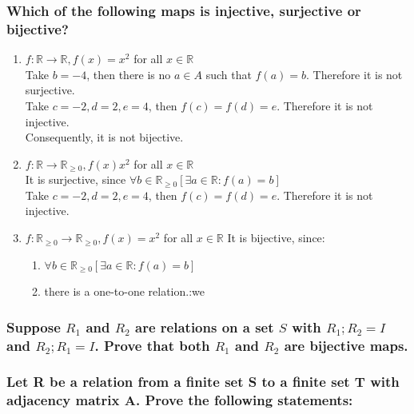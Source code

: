 \subsubsection{Which of the following maps is injective, surjective or bijective?}
\begin{enumerate}[label=(\alph*)]
    \item $f: \mathbb{R} \rightarrow \mathbb{R}, f(x) = x^2$ for all $x \in \mathbb{R}$\\
    Take $b = -4$, then there is no $a \in A$ such that $f(a) = b$. Therefore it is not surjective.\\
    Take $c = -2, d=2, e=4$, then $f(c) = f(d) = e$. Therefore it is not injective.\\
    Consequently, it is not bijective.

    \item $f: \mathbb{R} \rightarrow \mathbb{R}_{\ge 0}, f(x) x^2$ for all $x \in \mathbb{R}$\\
    It is surjective, since $\forall b \in \mathbb{R}_{\ge 0}[\exists a \in \mathbb{R}: f(a) = b]$ \\
    Take $c = -2, d=2, e=4$, then $f(c) = f(d) = e$. Therefore it is not injective.\\
    \item $f: \mathbb{R}_{\ge 0} \rightarrow \mathbb{R}_{\ge 0}, f(x) = x^2$ for all $x \in \mathbb{R}$
    It is bijective, since: \\
    \begin{enumerate}[label=\arabic*.]
        \item $\forall b \in \mathbb{R}_{\ge 0}[\exists a \in \mathbb{R}: f(a) = b]$
        \item there is a one-to-one relation.:we
    \end{enumerate}
\end{enumerate}

\subsubsection{Suppose $R_1$ and $R_2$ are relations on a set $S$ with $R_1;R_2 = I$ and $R_2;R_1 = I$. Prove that both $R_1$ and $R_2$ are bijective maps.}

\subsubsection{Let R be a relation from a finite set S to a finite set T with adjacency matrix A. Prove the
following statements:}

